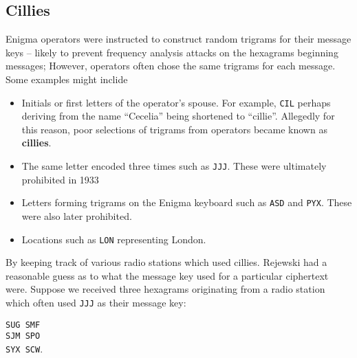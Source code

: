 \subsection{Cillies}\label{cillies}
Enigma operators were instructed to construct random trigrams for
their message keys -- likely to prevent frequency analysis attacks on
the hexagrams beginning messages; However, operators often chose the
same trigrams for each message. Some examples might inclide
\begin{itemize}
	\item Initials or first letters of the operator's spouse. For
	      example, \texttt{CIL} perhaps deriving from the name ``Cecelia''
	      being shortened to ``cillie''. Allegedly for this reason, poor
	      selections of trigrams from operators became known as {\bf{cillies}}.
	\item The same letter encoded three times such as \texttt{JJJ}. These were ultimately prohibited in 1933
	\item Letters forming trigrams on the Enigma keyboard such as \texttt{ASD} and \texttt{PYX}. These were also later prohibited.
	\item Locations such as \texttt{LON} representing London.

\end{itemize}
By keeping track of various radio stations which used cillies.
Rejewski had a reasonable guess as to what the message key used for a
particular ciphertext were. Suppose we received three hexagrams
originating from a radio station which often used \texttt{JJJ} as
their message key:
\begin{center}
	\texttt{SUG SMF}\\
	\texttt{SJM SPO}\\
	\texttt{SYX SCW}.
\end{center}

